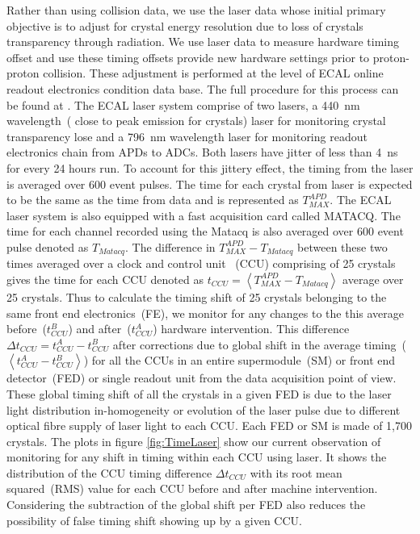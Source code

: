 Rather than using collision data, we use the laser data whose initial primary objective is to adjust for crystal energy resolution due to loss of crystals transparency through radiation. 
We use laser data to measure hardware timing offset and use these timing offsets provide new hardware settings prior to proton-proton collision. These adjustment is performed at the level of ECAL online readout electronics condition data base. The full procedure for this process can be found at \cite{LaserTiming}. The ECAL laser system comprise of two lasers, a 440~nm wavelength~( close to peak emission for \pb crystals) laser for monitoring crystal transparency lose and a 796~nm wavelength laser for monitoring readout electronics chain from APDs to ADCs. Both lasers have jitter of less than 4~ns for every 24 hours run. To account for this jittery effect, the timing from the laser is averaged over 600 event pulses. The time for each crystal from laser is expected to be the same as the time from data and is represented as $T^{APD}_{MAX} $. The ECAL laser system is also equipped with a fast acquisition card called MATACQ. The time for each channel recorded using the Matacq is also averaged over 600 event pulse denoted as $ T_{Matacq}$.
The difference in $ T^{APD}_{MAX} - T_{Matacq} $ between these two times averaged over a clock and control unit ~(CCU) comprising of 25 crystals gives the time for each CCU denoted as $ t_{CCU} = \left\langle T^{APD}_{MAX} - T_{Matacq} \right\rangle $ average over 25 crystals.
Thus to calculate the timing shift of 25 crystals belonging to the same front end electronics~(FE), we monitor for any changes to the this average before~($t^{B}_{CCU} $) and after~($t^{A}_{CCU} $) hardware intervention.  This difference $\Delta t_{CCU} = t^{A}_{CCU} - t^{B}_{CCU} $ after corrections due to global shift in the average timing~($\left\langle t^{A}_{CCU} - t^{B}_{CCU} \right\rangle $) for all the CCUs in an entire supermodule~(SM) or front end detector~(FED) or single readout unit from the data acquisition point of view. These global timing shift of all the crystals in a given FED is due to the laser light distribution in-homogeneity or evolution of the laser pulse due to different optical fibre supply of laser light to each CCU. Each FED or SM is made of 1,700 \pb crystals. 
The plots in figure \ref{fig:TimeLaser} show our current observation of  monitoring for any shift in timing within each CCU using laser. It shows the distribution of the CCU timing difference $ \Delta t_{CCU}$ with its root mean squared~(RMS) value for each CCU before and after machine intervention. Considering the subtraction of the global shift per FED also reduces the possibility of false timing shift showing up by a given CCU.

